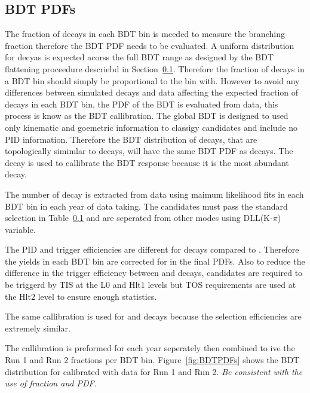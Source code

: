 \subsection{BDT PDFs}
The fraction of \bmumu decays in each BDT bin is meeded to measure the branching fraction therefore the BDT PDF needs to be evaluated. A uniform distribution for \bmumu decyas is expected acorss the full BDT range as designed by the BDT flattening proceedure descriebd in Section~\ref{}. Therefore the fraction of \bmumu decays in a BDT bin should simply be proportional to the bin with. However to avoid any differences between simulated decays and data affecting the expected fraction of \bmumu decays in each BDT bin, the PDF of the BDT is evaluated from data, this process is know as the BDT callibration.
The global BDT is designed to used only kinematic and goemetric information to classigy candidates and include no PID information. Therefore the BDT distribution of \bhh decays, that are topologically simimlar to \bmumu decays, will have the same BDT PDF as \bmumu decays. The \bdkpi decay is used to callibrate the BDT response because it is the most abundant \bhh decay. 

The number of \bdkpi decay is extracted from data using maimum likelihood fits in each BDT bin in each year of data taking. The \bdkpi candidates must pass the standard \bhh selection in Table~\ref{} and are seperated from other \bhh modes using DLL(K-$\pi$) variable. 

The PID and trigger efficiencies are different for \bdkpi decays compared to \bmumu. Therefore the \bdkpi yields in each BDT bin are corrected for in the final PDFs. Also to reduce the difference in the trigger efficiency between \bdkip and \bmumu decays, \bdkpi candidates are required to be triggerd by TIS at the L0 and Hlt1 levels but TOS requirements are used at the Hlt2 level to ensure enough statistics.

The same callibration is used for \bsmumu and \bdmumu decays because the selection efficiencies are extremely similar. 

The callibration is preformed for each year seperately then combined to ive the Run 1 and Run 2 fractions per BDT bin. Figure~\ref{fig:BDTPDFs} shows the BDT distribution for \bsmumu calibrated with \bdkpi data for Run 1 and Run 2. 
{\it Be consistent with the use of fraction and PDF.}


